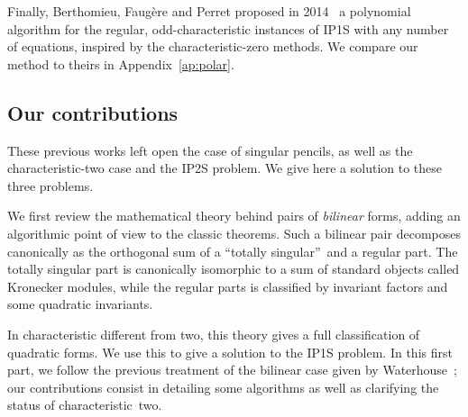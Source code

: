 \documentclass{amsart}
\begin{document}
Finally, Berthomieu, Faugère and Perret
proposed in 2014~\cite{DBLP:journals/corr/BerthomieuFP13}
a polynomial algorithm for the regular, odd-characteristic instances of IP1S
with any number of equations,
inspired by the characteristic-zero methods.
We compare our method to theirs in Appendix~\ref{ap:polar}.



\subsection*{Our contributions}

These previous works left open the case of singular pencils,
as well as the characteristic-two case
and the IP2S problem.
We give here a solution to these three problems.

We first review the mathematical theory behind pairs of \emph{bilinear} forms,
adding an algorithmic point of view to the classic theorems.
% 
Such a bilinear pair decomposes canonically as the orthogonal sum of
a “totally singular” and a regular part.
The totally singular part is canonically isomorphic to a sum of
standard objects called Kronecker modules,
while the regular parts is classified by invariant factors
and some quadratic invariants.

In characteristic different from two,
this theory gives a full classification of quadratic forms.
We use this to give a solution to the IP1S problem.
In this first part, we follow the previous treatment of
the bilinear case given by Waterhouse~\cite{inventiones1976waterhouse};
our contributions consist in detailing some algorithms
as well as clarifying the status of characteristic~two.
\end{document}
